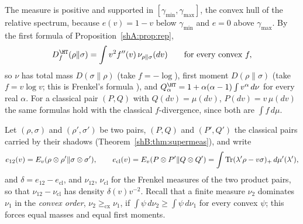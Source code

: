 The measure is positive and supported in $[\gamma_{\min},\gamma_{\max}]$, the convex hull of the relative spectrum, because $e(v)=1-v$ below $\gamma_{\min}$ and $e=0$ above $\gamma_{\max}$. By the first formula of Proposition~\ref{shA:prop:rep},
\[
D^\HT_f(\rho\|\sigma)=\int v^2f''(v)\,\nu_{\rho\|\sigma}(dv)\qquad\text{for every convex }f,
\]
so $\nu$ has total mass $D(\sigma\|\rho)$ (take $f=-\log$), first moment $D(\rho\|\sigma)$ (take $f=v\log v$; this is Frenkel's formula \cite{Frenkel2023}), and $Q^\HT_\alpha=1+\alpha(\alpha-1)\int v^\alpha\,d\nu$ for every real $\alpha$. For a classical pair $(P,Q)$ with $Q(dv)=\mu(dv)$, $P(dv)=v\,\mu(dv)$ the same formulas hold with the classical $f$-divergence, since both are $\int f\,d\mu$.

Let $(\rho,\sigma)$ and $(\rho',\sigma')$ be two pairs, $(P,Q)$ and $(P',Q')$ the classical pairs carried by their shadows (Theorem~\ref{shB:thm:supermeas}), and write
\[
e_{12}(v)=E_v(\rho\otimes\rho'\|\sigma\otimes\sigma'),\qquad e_{\mathrm{cl}}(v)=E_v(P\otimes P'\|Q\otimes Q')=\int\operatorname{Tr}(\lambda'\rho-v\sigma)_+\,d\mu'(\lambda'),
\]
and $\delta=e_{12}-e_{\mathrm{cl}}$,
and $\nu_{12}$, $\nu_{\mathrm{cl}}$ for the Frenkel measures of the two product pairs, so that $\nu_{12}-\nu_{\mathrm{cl}}$ has density $\delta(v)v^{-2}$. Recall that a finite measure $\nu_2$ dominates $\nu_1$ in the \emph{convex order}, $\nu_2\ge_{\mathrm{cx}}\nu_1$, if $\int\psi\,d\nu_2\ge\int\psi\,d\nu_1$ for every convex $\psi$; this forces equal masses and equal first moments.

